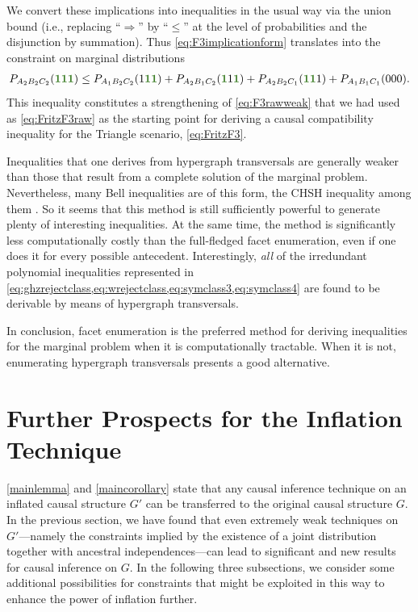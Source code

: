 \documentclass[aps,english,10pt,superscriptaddress,onecolumn,twoside,longbibliography,pra,floatfix,fleqn,nofootinbib]{revtex4-1}
\newcommand*{\mgreen}[1]{{\color{OliveGreen}{\mathbf{#1}}}}
\theoremstyle{definition}
\DeclarePairedDelimiter{\parens}{\lparen}{\rparen}
\begin{document}
We convert these implications into inequalities in the usual way via the union bound (i.e., replacing ``$\Rightarrow$'' by ``$\leq$'' at the level of probabilities and the disjunction by summation). Thus \cref{eq:F3implicationform} translates into the constraint on marginal distributions
\begin{align}\label{eq:F3rawprobform}
    P_{A_2 B_2 C_2}\parens{\mgreen{1} \mgreen{1} \mgreen{1}} \leq P_{A_1 B_2 C_2}\parens{1 \mgreen{1 1}}+P_{A_2 B_1 C_2}\parens{\mgreen{1} 1 \mgreen{1}}+P_{A_2 B_2 C_1}\parens{\mgreen{1 1} 1} + P_{A_1 B_1 C_1}\parens{0 0 0}.
\end{align}
This inequality constitutes a strengthening of \cref{eq:F3rawweak} that we had used as \cref{eq:FritzF3raw} as the starting point for deriving a causal compatibility inequality for the Triangle scenario, \cref{eq:FritzF3}.  

Inequalities that one derives from hypergraph transversals are generally weaker than those that result from a complete solution of the marginal problem. Nevertheless, many Bell inequalities are of this form, the CHSH inequality among them \cite{Ghirardi08}.  So it seems that this method is still sufficiently powerful to generate plenty of interesting inequalities. At the same time, the method is significantly less computationally costly than the full-fledged facet enumeration, even if one does it for every possible antecedent. Interestingly, \emph{all} of the irredundant polynomial inequalities represented in \cref{eq:ghzrejectclass,eq:wrejectclass,eq:symclass3,eq:symclass4} are found to be derivable by means of hypergraph transversals.

In conclusion, facet enumeration is the preferred method for deriving inequalities for the marginal problem when it is computationally tractable.  When it is not, enumerating hypergraph transversals presents a good alternative.

\section{Further Prospects for the Inflation Technique}\label{sec:otherprospects}

\cref{mainlemma} and \cref{maincorollary} state that any causal inference technique on an inflated causal structure $G'$ can be transferred to the original causal structure $G$. In the previous section, we have found that even extremely weak techniques on $G'$---namely the constraints implied by the existence of a joint distribution together with ancestral independences---can lead to significant and new results for causal inference on $G$. In the following three subsections, we consider some additional possibilities for constraints that might be exploited in this way to enhance the power of inflation further.
\end{document}
